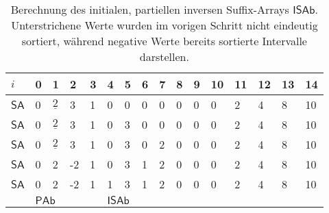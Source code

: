 \begin{table}
	\begin{tabular}{l|llll|llll|lllllll}
		$i$  & 0 & 1                         & 2                          & 3 & 4                         & 5                         & 6                         & 7                         & 8 & 9 & 10 & 11 & 12 & 13 & 14 \\ \hline
		$\mathsf{SA}$ & 0 & $\underline{2}$           & 3                          & 1 & 0                         & 0                         & 0                         & 0                         & 0 & 0 & 0  & 2  & 4  & 8  & 10 \\ \hline
		$\mathsf{SA}$ & 0 & $\underline{2}$           & 3                          & 1 & 0                         & \cellcolor[HTML]{32CB00}3 & 0                         & 0                         & 0 & 0 & 0  & 2  & 4  & 8  & 10 \\ \hline
		$\mathsf{SA}$ & 0 & $\underline{2}$           & 3                          & 1 & 0                         & 3                         & 0                         & \cellcolor[HTML]{32CB00}2 & 0 & 0 & 0  & 2  & 4  & 8  & 10 \\ \hline
		$\mathsf{SA}$ & 0 & \cellcolor[HTML]{34CDF9}2 & \cellcolor[HTML]{32CB00}-2 & 1 & 0                         & 3                         & \cellcolor[HTML]{32CB00}1 & 2                         & 0 & 0 & 0  & 2  & 4  & 8  & 10 \\ \hline
		$\mathsf{SA}$ & 0 & 2                         & -2                         & 1 & \cellcolor[HTML]{32CB00}1 & 3                         & 1                         & 2                         & 0 & 0 & 0  & 2  & 4  & 8  & 10 \\ \hline
		& \multicolumn{4}{l|}{$\mathsf{PAb}$}                                       & \multicolumn{4}{l|}{$\mathsf{ISAb}$}                                                                                     &   &   &    &    &    &    &   
	\end{tabular}
	\caption{Berechnung des initialen, partiellen inversen Suffix-Arrays $\mathsf{ISAb}$. Unterstrichene Werte wurden im vorigen Schritt nicht eindeutig sortiert, während negative Werte bereits sortierte Intervalle darstellen.}
	\label{dss:table:isa}
\end{table}


